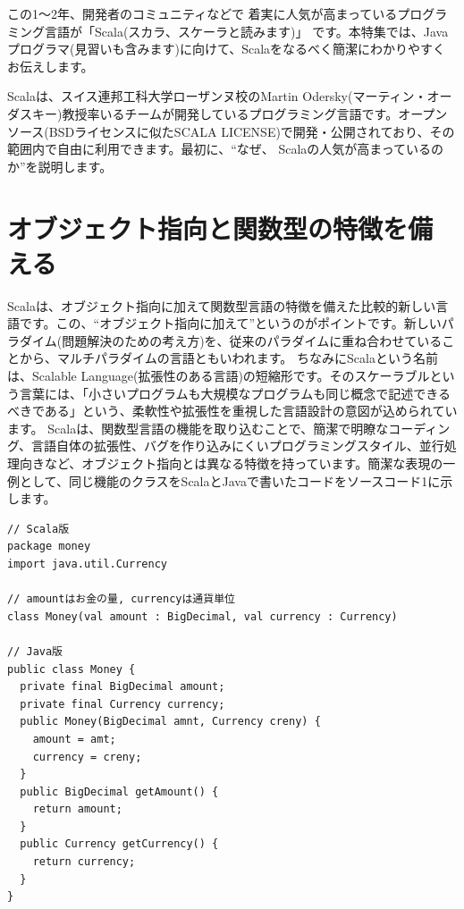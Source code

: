 \documentclass[10pt]{jarticle}
\begin{document}
  \begin{screen}
この1〜2年、開発者のコミュニティなどで 着実に人気が高まっているプログラミング言語が「Scala(スカラ、スケーラと読みます)」 です。本特集では、Javaプログラマ(見習いも含みます)に向けて、Scalaをなるべく簡潔にわかりやすくお伝えします。  
  \end{screen}

Scalaは、スイス連邦工科大学ローザンヌ校のMartin Odersky(マーティン・オーダスキー)教授率いるチームが開発しているプログラミング言語です。オープンソース(BSDライセンスに似たSCALA LICENSE)で開発・公開されており、その範囲内で自由に利用できます。最初に、“なぜ、 Scalaの人気が高まっているのか”を説明します。


\section*{オブジェクト指向と関数型の特徴を備える} 
Scalaは、オブジェクト指向に加えて関数型言語の特徴を備えた比較的新しい言語です。この、“オブジェクト指向に加えて”というのがポイントです。新しいパラダイム(問題解決のための考え方)を、従来のパラダイムに重ね合わせていることから、マルチパラダイムの言語ともいわれます。 ちなみにScalaという名前は、Scalable Language(拡張性のある言語)の短縮形です。そのスケーラブルという言葉には、「小さいプログラムも大規模なプログラムも同じ概念で記述できるべきである」という、柔軟性や拡張性を重視した言語設計の意図が込められています。 Scalaは、関数型言語の機能を取り込むことで、簡潔で明瞭なコーディング、言語自体の拡張性、バグを作り込みにくいプログラミングスタイル、並行処理向きなど、オブジェクト指向とは異なる特徴を持っています。簡潔な表現の一例として、同じ機能のクラスをScalaとJavaで書いたコードをソースコード1に示します。 

\begin{lstlisting}[label=src:money, caption=お金を表すクラスのScala版とJava版]
// Scala版
package money
import java.util.Currency

// amountはお金の量, currencyは通貨単位    
class Money(val amount : BigDecimal, val currency : Currency)    
 
// Java版
public class Money {
  private final BigDecimal amount;
  private final Currency currency;
  public Money(BigDecimal amnt, Currency creny) {
    amount = amt;
    currency = creny;
  }
  public BigDecimal getAmount() {
    return amount;
  }
  public Currency getCurrency() {
    return currency;
  }
}
\end{lstlisting}
\end{document}
